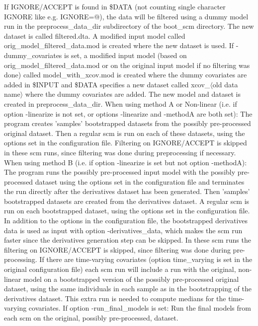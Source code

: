 If IGNORE/ACCEPT is found in \$DATA (not counting single character IGNORE like e.g. IGNORE=@), the data will be filtered using a dummy model run in the preprocess\_data\_dir subdirectory of the boot\_scm directory. The new dataset is called filtered.dta. A modified input model called orig\_model\_filtered\_data.mod is created where the new dataset is used.
If -dummy\_covariates is set, a modified input model (based on orig\_model\_filtered\_data.mod or on the original input model if no filtering was done) called model\_with\_xcov.mod is created where the dummy covariates are added in \$INPUT and \$DATA specifies a new dataset called xcov\_$\langle$old data name$\rangle$ where the dummy covariates are added. The new model and dataset is created in preprocess\_data\_dir. 
When using method A or Non-linear (i.e. if option -linearize is not set, or options -linearize and -methodA are both set): The program creates 'samples' bootstrapped datasets from the possibly pre-processed original dataset. Then a regular scm is run on each of these datasets, using the options set in the configuration file. Filtering on IGNORE/ACCEPT is skipped in these scm runs, since filtering was done during preprocessing if necessary. 
When using method B (i.e. if option -linearize is set but not option -methodA): The program runs the possibly pre-processed input model with the possibly pre-processed dataset using the options set in the configuration file and terminates the run directly after the derivatives dataset has been generated. Then 'samples' bootstrapped datasets are created from the derivatives dataset. A regular scm is run on each bootstrapped dataset, using the options set in the configuration file. In addition to the options in the configuration file, the bootstrapped derivatives data is used as input with option -derivatives\_data, which makes the scm run faster since the derivatives generation step can be skipped. In these scm runs the filtering on IGNORE/ACCEPT is skipped, since filtering was done during pre-processing. If there are time-varying covariates (option time\_varying is set in the original configuration file) each scm run will include a run with the original, non-linear model on a bootstrapped version of the possibly pre-processed original dataset, using the same individuals in each sample as in the bootstrapping of the derivatives dataset. This extra run is needed to compute medians for the time-varying covariates. 
If option -run\_final\_models is set: Run the final models from each scm on the original, possibly pre-processed, dataset.


